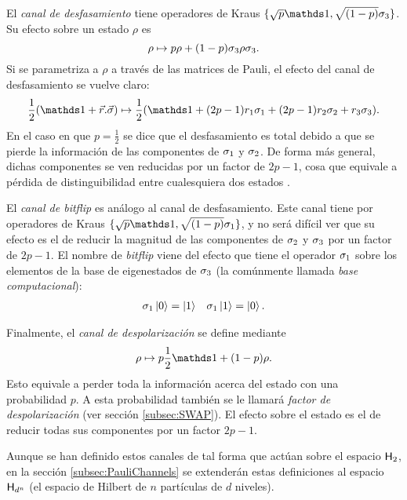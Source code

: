 El \textit{canal de desfasamiento} tiene operadores de Kraus $\{\sqrt{p}\Id,\sqrt{(1-p)}\pauli{3}\}$. Su efecto sobre un estado $\rho$ es
\begin{equation}
    \rho\mapsto p\rho+(1-p)\sigma_{3}\rho\sigma_{3}.\nonumber
\end{equation}
Si se parametriza a $\rho$ a través de las matrices de Pauli, el efecto del canal de desfasamiento se vuelve claro:
\begin{equation}
    \frac{1}{2}\qty(\Id+\vec{r}.\vec{\sigma})\mapsto \frac{1}{2}\qty(\Id+(2p-1)r_{1}\sigma_{1}+(2p-1)r_{2}\sigma_{2}+r_{3}\sigma_{3}).\nonumber
\end{equation}
En el caso en que $p=\frac{1}{2}$ se dice que el desfasamiento es total debido a que se pierde la información de las componentes de $\sigma_{1}$ y $\sigma_{2}$. De forma más general, dichas componentes se ven reducidas por un factor de $2p-1$, cosa que equivale a pérdida de distinguibilidad entre cualesquiera dos estados \cite{Chuang}.

El \textit{canal de bitflip} es análogo al canal de desfasamiento. Este canal tiene por operadores de Kraus $\{\sqrt{p}\Id,\sqrt{(1-p)}\pauli{1}\}$, y no será difícil ver que su efecto es el de reducir la magnitud de las componentes de $\sigma_{2}$ y $\sigma_{3}$ por un factor de $2p-1$. El nombre de \textit{bitflip} viene del efecto que tiene el operador $\sigma_{1}$ sobre los elementos de la base de eigenestados de $\sigma_{3}$ (la comúnmente llamada \textit{base computacional}):
\begin{align}
    \sigma_{1}\ket{0}=\ket{1}& &\sigma_{1}\ket{1}=\ket{0}\nonumber.
\end{align}

Finalmente, el \textit{canal de despolarización} se define mediante
\begin{equation}
    \rho\mapsto p\frac{1}{2}\Id+(1-p)\rho\nonumber.
\end{equation}
Esto equivale a perder toda la información acerca del estado con una probabilidad $p$. A esta probabilidad también se le llamará \textit{factor de despolarización} (ver sección \ref{subsec:SWAP}). El efecto sobre el estado es el de reducir todas sus componentes por un factor $2p-1$. 

Aunque se han definido estos canales de tal forma que actúan sobre el espacio ${\sf H}_{2}$, en la sección \ref{subsec:PauliChannels} se extenderán estas definiciones al espacio ${\sf H}_{d^{n}}$ (el espacio de Hilbert de $n$ partículas de $d$ niveles).